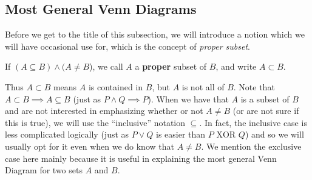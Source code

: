 \subsection{Most General Venn Diagrams}
Before we get to the title of this subsection,
we will introduce a notion which we will have occasional use
for, which is the concept of {\it proper subset}.
\begin{definition}If $(A\subseteq B)\wedge (A\ne B$), we call $A$ a
{\bf proper} subset of $B$, and write $A\subset B$\footnotemark. 
\end{definition}
Thus $A\subset B$ means $A$ is contained in $B$, but $A$ is not all of $B$.
Note that $A\subset B\implies A\subseteq B$
(just as $P\wedge Q\implies P$).  When we have that $A$ is a
subset of $B$ and are not
interested in emphasizing whether or not $A\ne B$ (or are not sure if
this is true), we will use the ``inclusive'' notation $\subseteq$.
In fact, the inclusive case is less complicated logically
(just as $P\vee Q$ is easier than $P\text{ XOR }Q$)
and so we will usually opt for it even when we do know that
$A\ne B$.  We mention the exclusive case here mainly because
it is useful in explaining the most general Venn Diagram
for two sets $A$ and $B$.


